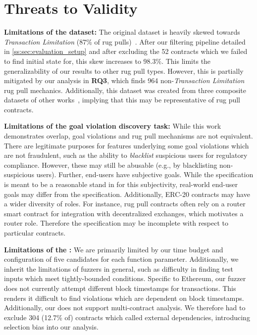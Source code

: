 \section{Threats to Validity}
\label{ss:sec:threats_to_validity}


\smallskip
\noindent \textbf{Limitations of the dataset:}
The original dataset is heavily skewed towards \textit{Transaction Limitation} (87\% of rug pulls)~\cite{SoKRugPull2025}.
After our filtering pipeline detailed in \autoref{ss:sec:evaluation_setup} and after excluding the 52 contracts which we failed to find initial state for, this skew increases to 98.3\%.
This limits the generalizability of our results to other rug pull types.
However, this is partially mitigated by our analysis in \textbf{RQ3}, which finds 964 non-\textit{Transaction Limitation} rug pull mechanics.
Additionally, this dataset was created from three composite datasets of other works~\cite{pied-piper,honeypot_usenix19,trapdoor}, implying that this may be representative of rug pull contracts.

\smallskip
\noindent
\textbf{Limitations of the goal violation discovery task:}
    While this work demonstrates overlap, goal violations and rug pull mechanisms are not equivalent.
    There are legitimate purposes for features underlying some goal violations which are not fraudulent, such as the ability to \textit{blacklist} suspicious users for regulatory compliance.
    However, these may still be abusable (e.g., by blacklisting non-suspicious users).
    Further, end-users have subjective goals.
    While the specification is meant to be a reasonable stand in for this subjectivity, real-world end-user goals may differ from the specification.
    Additionally, ERC-20 contracts may have a wider diversity of roles.
    For instance, rug pull contracts often rely on a router smart contract for integration with decentralized exchanges, which motivates a router role.
    Therefore the specification may be incomplete with respect to particular contracts.

\smallskip
\noindent
\textbf{Limitations of the \spoilsport {}:}
We are primarily limited by our time budget and configuration of five candidates for each function parameter.
Additionally, we inherit the limitations of fuzzers in general, such as difficulty in finding test inputs which meet tightly-bounded conditions.
Specific to Ethereum, our fuzzer does not currently attempt different block timestamps for transactions.
This renders it difficult to find violations which are dependent on block timestamps.
Additionally, our  does not support multi-contract analysis.
We therefore had to exclude 304 (12.7\% of) contracts which called external dependencies, introducing selection bias into our analysis.

